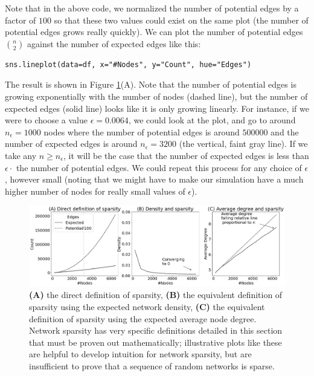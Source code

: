 Note that in the above code, we normalized the number of potential edges by a factor of $100$ so that these two values could exist on the same plot (the number of potential edges grows really quickly). We can plot the number of potential edges $\binom n 2$ against the number of expected edges like this:
\begin{lstlisting}[style=python]
sns.lineplot(data=df, x="#Nodes", y="Count", hue="Edges")
\end{lstlisting}
The result is shown in Figure \ref{fig:ch7:density:sparsity}(A). Note that the number of potential edges is growing exponentially with the number of nodes (dashed line), but the number of expected edges (solid line) looks like it is only growing linearly. For instance, if we were to choose a value $\epsilon = 0.0064$, we could look at the plot, and go to around $n_\epsilon = 1000$ nodes where the number of potential edges is around $500000$ and the number of expected edges is around $n_\epsilon = 3200$ (the vertical, faint gray line). If we take any $n \geq n_{\epsilon}$, it will be the case that the number of expected edges is less than $\epsilon\cdot$ the number of potential edges. We could repeat this process for any choice of $\epsilon$, however small (noting that we might have to make our simulation have a much higher number of nodes for really small values of $\epsilon$).

\begin{figure}
    \centering
    \includegraphics[width=\linewidth]{applications/ch7/Images/sparse_nets.png}
    \caption[Conceptualizing sparse networks]{\textbf{(A)} the direct definition of sparsity, \textbf{(B)} the equivalent definition of sparsity using the expected network density, \textbf{(C)} the equivalent definition of sparsity using the expected average node degree. Network sparsity has very specific definitions detailed in this section that must be proven out mathematically; illustrative plots like these are helpful to develop intuition for network sparsity, but are insufficient to prove that a sequence of random networks is sparse.}
    \label{fig:ch7:density:sparsity}
\end{figure}

